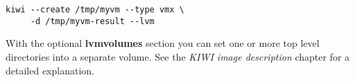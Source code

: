\begin{Command}{12cm}
\begin{verbatim}
kiwi --create /tmp/myvm --type vmx \
     -d /tmp/myvm-result --lvm
\end{verbatim}
\end{Command}

With the optional \textbf{lvmvolumes} section you can set one or
more top level directories into a separate volume. See the
\textit{KIWI image description} chapter for a detailed explanation.
